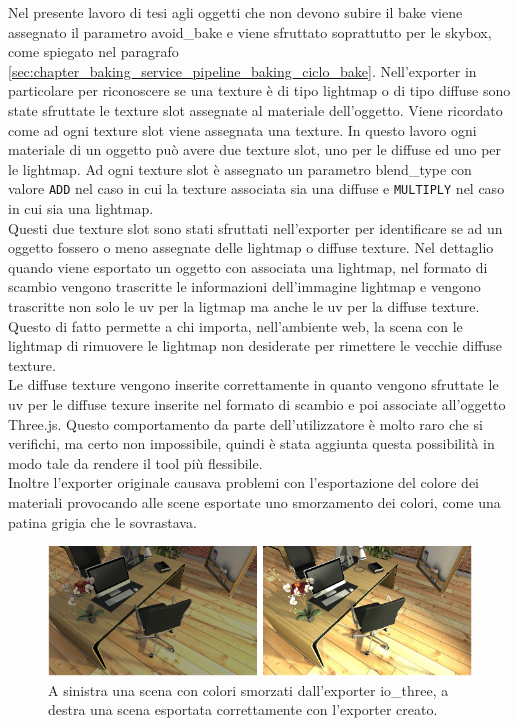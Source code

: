 Nel presente lavoro di tesi agli oggetti che non devono subire il bake viene assegnato il parametro avoid\_bake e viene sfruttato soprattutto per le skybox, come spiegato nel paragrafo \ref{sec:chapter_baking_service_pipeline_baking_ciclo_bake}.
Nell’exporter in particolare per riconoscere se una texture è di tipo lightmap o di tipo diffuse sono state sfruttate le texture slot assegnate al materiale dell’oggetto. 
Viene ricordato come ad ogni texture slot viene assegnata una texture. In questo lavoro ogni materiale di un oggetto può avere due texture slot, uno per le diffuse ed uno per le lightmap.
Ad ogni texture slot è assegnato un parametro blend\_type con valore \texttt{ADD} nel caso in cui la texture associata sia una diffuse e \texttt{MULTIPLY} nel caso in cui sia una lightmap.
\\
Questi due texture slot sono stati sfruttati nell’exporter per identificare se ad un oggetto fossero o meno assegnate delle lightmap o diffuse texture.
Nel dettaglio quando viene esportato un oggetto con associata una lightmap, nel formato di scambio vengono trascritte le informazioni dell’immagine lightmap e vengono trascritte non solo le uv per la ligtmap ma anche le uv per la diffuse texture.
Questo di fatto permette a chi importa, nell’ambiente web, la scena con le lightmap di rimuovere le lightmap non desiderate per rimettere le vecchie diffuse texture.
\\ 
Le diffuse texture vengono inserite correttamente in quanto vengono sfruttate le uv per le diffuse texure inserite nel formato di scambio e poi associate all’oggetto Three.js.
Questo comportamento da parte dell’utilizzatore è molto raro che si verifichi, ma certo non impossibile, quindi è stata aggiunta questa possibilità in modo tale da rendere il tool più flessibile.
\\
Inoltre l’exporter originale causava problemi con l’esportazione del colore dei materiali provocando alle scene esportate uno smorzamento dei colori, come una patina grigia che le sovrastava.
\\
\begin{figure}[htb]
 \centering
 \includegraphics[width=1\linewidth]{images/chapter_baking_service/grigio_chiaro.png}\hfill
 \caption[Miglioramenti nell'esportazione dei colori.]{A sinistra una scena con colori smorzati dall'exporter io\_three, a destra una scena esportata correttamente con l'exporter creato.}
 \label{fig:baking_service_grigio_chiaro}
\end{figure}
